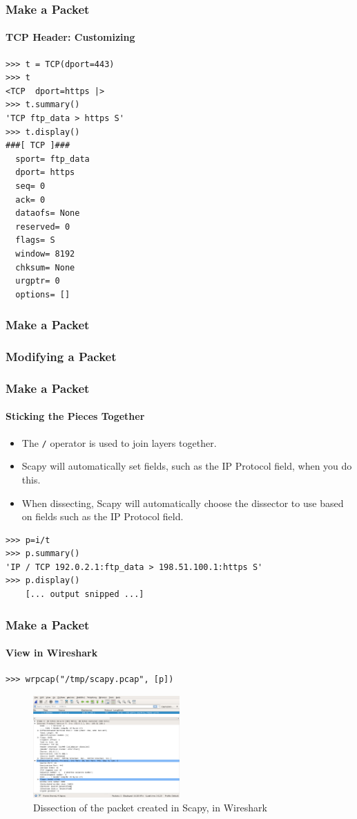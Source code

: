 \documentclass[notes]{beamer}
\newcommand{\todo}[1]{{\color{blue}{{\bf todo: }#1}}}
\begin{document}
\begin{frame}[fragile]
\frametitle{Make a Packet}
\framesubtitle{TCP Header: Customizing}
\begin{lstlisting}[caption={Customizing a TCP Header}]
>>> t = TCP(dport=443)
>>> t
<TCP  dport=https |>
>>> t.summary()
'TCP ftp_data > https S'
>>> t.display()
###[ TCP ]### 
  sport= ftp_data
  dport= https
  seq= 0
  ack= 0
  dataofs= None
  reserved= 0
  flags= S
  window= 8192
  chksum= None
  urgptr= 0
  options= []
\end{lstlisting}
\end{frame}

\begin{frame}
\frametitle{Make a Packet}
\frametitle{Modifying a Packet}
\todo{Modify a packet}
\end{frame}

\begin{frame}[fragile]
\frametitle{Make a Packet}
\framesubtitle{Sticking the Pieces Together}
\begin{itemize}
\item{The \texttt{/} operator is used to join layers together.}
\item{Scapy will automatically set fields, such as the IP Protocol field, when
      you do this.}
\item{When dissecting, Scapy will automatically choose the dissector to use
      based on fields such as the IP Protocol field.}
\end{itemize}
\begin{lstlisting}[caption={Sticking the IP and TCP Headers Together}]
>>> p=i/t
>>> p.summary()
'IP / TCP 192.0.2.1:ftp_data > 198.51.100.1:https S'
>>> p.display()
    [... output snipped ...]
\end{lstlisting}
\end{frame}

\begin{frame}[fragile]
\frametitle{Make a Packet}
\framesubtitle{View in Wireshark}
\begin{lstlisting}[caption={Exporting a PCAP File from Scapy}]
>>> wrpcap("/tmp/scapy.pcap", [p])
\end{lstlisting}
\begin{figure}
\includegraphics[width=0.5\textwidth]{scapy-wireshark.png}
\caption{Dissection of the packet created in Scapy, in Wireshark}
\end{figure}
\end{frame}
\end{document}

